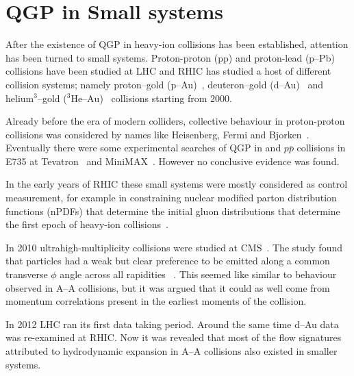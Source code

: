 
\section{QGP in Small systems}
\label{sec:smallsystem}
After the existence of QGP in heavy-ion collisions has been established, attention has been turned to small systems. Proton-proton (pp) and proton-lead (p--Pb) collisions have been studied at LHC and RHIC has studied a host of different collision systems; namely proton--gold (p--Au)~\cite{Aidala:2016vgl}, deuteron--gold (d--Au)~\cite{Adler:2003ii,Arsene:2003yk,Back:2003ns,Adams:2003im} and helium$^3$--gold ($^3\mbox{He--Au}$)~\cite{Adare:2015ctn} collisions starting from 2000. %

Already before the era of modern colliders, collective behaviour in proton-proton collisions was considered by names like Heisenberg, Fermi and Bjorken~\cite{Nagle:2018nvi}. Eventually there were some experimental searches of QGP in \pp and $p\bar p$ collisions in E735 at Tevatron~\cite{Alexopoulos:1993wt} and MiniMAX~\cite{Brooks:1999xy}. However no conclusive evidence was found. 

In the early years of RHIC these small systems were mostly considered as control measurement, for example in constraining nuclear modified parton distribution functions (nPDFs) that determine the initial gluon distributions that determine the first epoch of heavy-ion collisions~\cite{Shen:2015qta, Adare:2015lcd}. 

In 2010 ultrahigh-multiplicity \pp collisions were studied at CMS~\cite{Khachatryan:2010gv}. The study found that particles had a weak but clear preference to be emitted along a common transverse $\phi$ angle across all rapidities ~\cite{Salgado:2016jws}. This seemed like similar to behaviour observed in A--A collisions, but it was argued that it could as well come from momentum correlations present in the earliest moments of the collision.

In 2012 LHC ran its first \pPb data taking period. Around the same time d--Au data was re-examined at RHIC. Now it was revealed that most of the flow signatures attributed to hydrodynamic expansion in A--A collisions also existed in smaller systems.



